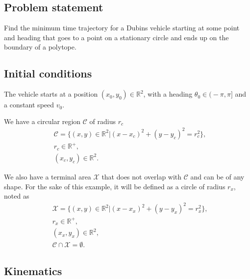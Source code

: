 \documentclass[12pt]{article}
\begin{document}
\subsection{Problem statement}

Find the minimum time trajectory for a Dubins vehicle starting at some point and heading that goes to a point on a stationary circle and ends up on the boundary of a polytope.


\subsection{Initial conditions}

The vehicle starts at a position $(x_0,y_0) \in \mathbb{R}^2$, with a heading $\theta_0 \in (\!-\!\pi,\pi]$ and a constant speed $v_0$.

We have a circular region $\mathcal{C}$ of radius $r_c$
\begin{align}
    &\mathcal{C} = \{ (x,y) \in \mathbb{R}^2 | (x-x_c)^2 + (y-y_c)^2 = r_c^2 \},\\
    &r_c \in \mathbb{R}^+, \nonumber\\
    &(x_c,y_c) \in  \mathbb{R}^2. \nonumber
\end{align}

We also have a terminal area $\mathcal{X}$ that does not overlap with $\mathcal{C}$ and can be of any shape. For the sake of this example, it will be defined as a circle of radius $r_x$, noted as
\begin{align}
    &\mathcal{X} = \{ (x,y) \in \mathbb{R}^2 | (x-x_x)^2 + (y-y_x)^2 = r_x^2 \},\\
    &r_x \in \mathbb{R}^+, \nonumber\\
    &(x_x,y_x) \in  \mathbb{R}^2, \nonumber\\
    &\mathcal{C}\cap \mathcal{X} = \emptyset. \nonumber
\end{align}


\subsection{Kinematics}
\end{document}
